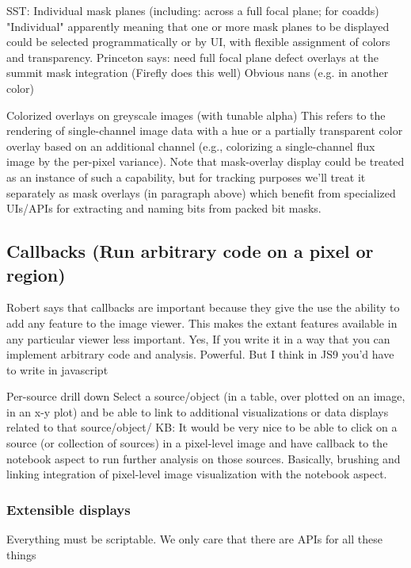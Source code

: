 SST: Individual mask planes (including: across a full focal plane; for coadds)
"Individual" apparently meaning that one or more mask planes to be displayed could be selected programmatically or by UI, with flexible assignment of colors and transparency.
Princeton says: need full focal plane defect overlays at the summit
mask integration (Firefly does this well)
Obvious nans (e.g. in another color)

Colorized overlays on greyscale images (with tunable alpha)
This refers to the rendering of single-channel image data with a hue or a partially transparent color overlay based on an additional channel (e.g., colorizing a single-channel flux image by the per-pixel variance). Note that mask-overlay display could be treated as an instance of such a capability, but for tracking purposes we'll treat it separately as mask overlays (in paragraph above) which benefit from specialized UIs/APIs for extracting and naming bits from packed bit masks.


\subsection{Callbacks (Run arbitrary code on a pixel or region)}

Robert says that callbacks are important because they give the use the ability to add any feature to the image viewer. This makes the extant features available in any particular viewer less important.
Yes, If you write it in a way that you can implement arbitrary code and analysis.  Powerful. But I think in JS9 you'd have to write in javascript

Per-source drill down
Select a source/object (in a table, over plotted on an image, in an x-y plot) and be able to link to additional visualizations or data displays related to that source/object/
KB: It would be very nice to be able to click on a source (or collection of sources) in a pixel-level image and have callback to the notebook aspect to run further analysis on those sources. Basically, brushing and linking integration of pixel-level image visualization with the notebook aspect.


\subsubsection{Extensible displays}
Everything must be scriptable.
We only care that there are APIs for all these things

